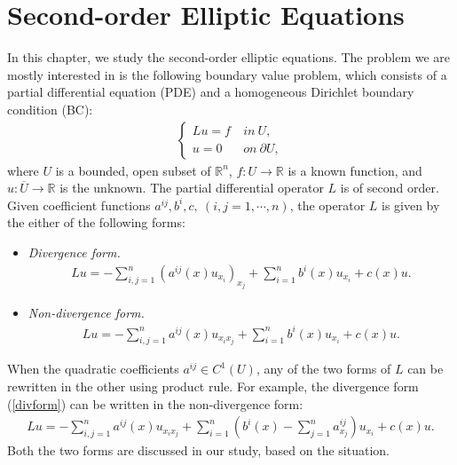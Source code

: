 \documentclass{article}
\numberwithin{equation}{section}
\newcommand{\bbR}{\mathbb{R}}
\newcommand{\ol}{\overline}
\theoremstyle{plain}
\theoremstyle{definition}
\begin{document}
\newpage
\section{Second-order Elliptic Equations}
In this chapter, we study the second-order elliptic equations. The problem we are mostly interested in is the following boundary value problem, which consists of a partial differential equation (PDE) and a homogeneous Dirichlet boundary condition (BC):
\begin{align}
\begin{cases}
	Lu=f\ &in\ U,\\
	u=0\ &on\ \partial U,
\end{cases}\label{bvpdir}
\end{align}
where $U$ is a bounded, open subset of $\bbR^n$, $f:U\to\bbR$ is a known function, and $u:\ol{U}\to\bbR$ is the unknown. The partial differential operator $L$ is of second order. Given coefficient functions $a^{ij},b^i,c,\ (i,j=1,\cdots,n)$, the operator $L$ is given by the either of the following forms:
\begin{itemize}
	\item\textit{Divergence form.} 
	\begin{align}
		Lu=-\sum_{i,j=1}^n\left(a^{ij}(x)u_{x_i}\right)_{x_j}+\sum_{i=1}^n b^i(x)u_{x_i}+c(x)u.\label{divform}
	\end{align}
	\item\textit{Non-divergence form.}
	\begin{align}
		Lu=-\sum_{i,j=1}^n a^{ij}(x)u_{x_ix_j}+\sum_{i=1}^n b^i(x)u_{x_i}+c(x)u.\label{nondivform}
	\end{align}
\end{itemize}
When the quadratic coefficients $a^{ij}\in C^1(U)$, any of the two forms of $L$ can be rewritten in the other using product rule. For example, the divergence form (\ref{divform}) can be written in the non-divergence form:
\begin{align*}
	Lu=-\sum_{i,j=1}^na^{ij}(x)u_{x_ix_j}+\sum_{i=1}^n \left(b^i(x)-\sum_{j=1}^na^{ij}_{x_j}\right)u_{x_i}+c(x)u.
\end{align*}
Both the two forms are discussed in our study, based on the situation.
\end{document}
